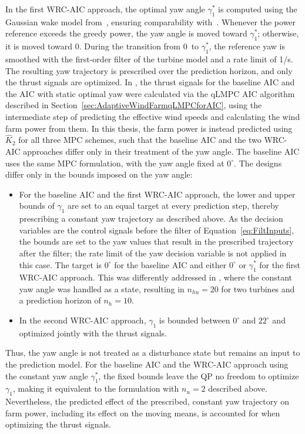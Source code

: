 In the first WRC-AIC approach, the optimal yaw angle $\gamma_1^*$ is computed using the Gaussian wake model from~\cite{bastankhah2016experimental}, ensuring comparability with~\cite{boersma2019constrained}. Whenever the power reference exceeds the greedy power, the yaw angle is moved toward $\gamma_1^*$; otherwise, it is moved toward 0\textdegree. During the transition from 0\textdegree~to $\gamma_1^*$, the reference yaw is smoothed with the first-order filter of the turbine model and a rate limit of 1\textdegree/s. The resulting yaw trajectory is prescribed over the prediction horizon, and only the thrust signals are optimized. In \cite{dittmer2023koopman}, the thrust signals for the baseline AIC and the AIC with static optimal yaw were calculated via the qLMPC AIC algorithm described in Section~\ref{sec:AdaptiveWindFarmqLMPCforAIC}, using the intermediate step of predicting the effective wind speeds and calculating the wind farm power from them. In this thesis, the farm power is instead predicted using $\hat{K}_2$ for all three MPC schemes, such that the baseline AIC and the two WRC-AIC approaches differ only in their treatment of the yaw angle. The baseline AIC uses the same MPC formulation, with the yaw angle fixed at $0^\circ$. The designs differ only in the bounds imposed on the yaw angle:
\begin{itemize}
    \item For the baseline AIC and the first WRC-AIC approach, the lower and upper bounds of $\gamma_1$ are set to an equal target at every prediction step, thereby prescribing a constant yaw trajectory as described above. As the decision variables are the control signals before the filter of Equation~\eqref{eq:FiltInputs}, the bounds are set to the yaw values that result in the prescribed trajectory after the filter; the rate limit of the yaw decision variable is not applied in this case. The target is $0^\circ$ for the baseline AIC and either $0^\circ$ or $\gamma_1^*$ for the first WRC-AIC approach. This was differently addressed in \cite{dittmer2023koopman}, where the constant yaw angle was handled as a state, resulting in $n_{hu} = 20$ for two turbines and a prediction horizon of $n_h = 10$. 
    \item In the second WRC-AIC approach, $\gamma_1$ is bounded between $0^\circ$ and $22^\circ$ and optimized jointly with the thrust signals.
\end{itemize}
Thus, the yaw angle is not treated as a disturbance state but remains an input to the prediction model. For the baseline AIC and the WRC-AIC approach using the constant yaw angle $\gamma_1^*$, the fixed bounds leave the QP no freedom to optimize $\gamma_1$, making it equivalent to the formulation with $n_u = 2$ described above. Nevertheless, the predicted effect of the prescribed, constant yaw trajectory on farm power, including its effect on the moving means, is accounted for when optimizing the thrust signals.

